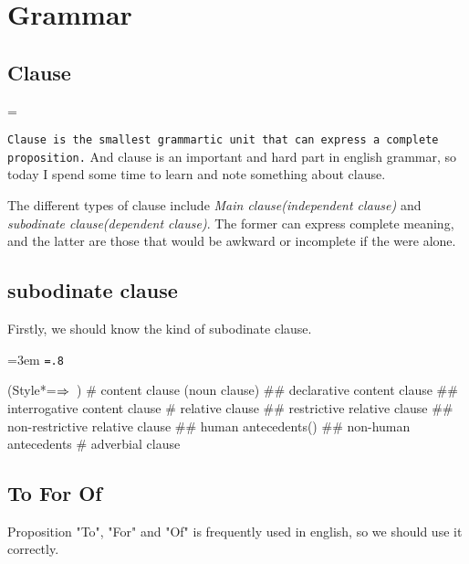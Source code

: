 \chapter{Grammar}

\section{Clause}
\makeatletter
\newbox\b@xbigstar \setbox\b@xbigstar=\hbox{\scalebox{2}{$\star$}}
\def\bigstar{{\copy\b@xbigstar}}
\makeatother

{\tt Clause is the smallest grammartic unit that can express a complete proposition.}
And clause is an important and hard part in english grammar, so today I spend some
time to learn and note something about clause.

The different types of clause include \emph{Main clause(independent clause)} and 
\emph{subodinate clause(dependent clause)}.
The former can express complete meaning, and the latter are those that would be
awkward or incomplete if the were alone.

\section{subodinate clause}

Firstly, we should know the kind of subodinate clause.\par
{\leftskip=3em \medskip \tt \baselineskip=.8\baselineskip
\begin{easylist}[checklist]
\ListProperties(Style*=$\Rightarrow\hskip.5em$)
# content clause (noun clause)
## declarative content clause
## interrogative content clause
# relative clause
## restrictive relative clause
## non-restrictive relative clause
## human antecedents()
## non-human antecedents
# adverbial clause
\end{easylist}
}

\section{To For Of}

Proposition "To", "For" and "Of" is frequently used in english, so we should use it correctly.

